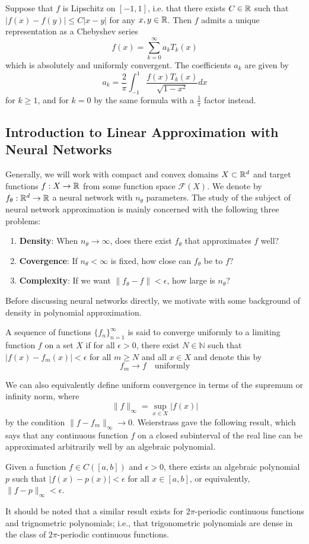 \begin{theorem} Suppose that $f$ is Lipschitz on $[-1,1]$, i.e. that there exists $C \in \mathbb{R}$ such that $|f(x) - f(y)| \leq C|x - y|$ for any $x, y \in \mathbb{R}$. Then $f$ admits a unique representation as a Chebyshev series
	\[ f(x) = \sum_{k=0}^\infty a_k T_k(x) \]
	which is absolutely and uniformly convergent. The coefficients $a_k$ are given by
	\[ a_k = \frac{2}{\pi} \int_{-1}^1 \frac{f(x)T_k(x)}{\sqrt{1-x^2}} dx \]
	for $k \geq 1$, and for $k=0$ by the same formula with a $\frac{1}{\pi}$ factor instead.
\end{theorem}

\subsection{Introduction to Linear Approximation with Neural Networks}
Generally, we will work with compact and convex domains $X \subset \mathbb{R}^d$ and target functions $f: X \rightarrow \mathbb{R}$ from some function space $\mathcal{F}(X)$. We denote by $f_\theta: \mathbb{R}^d \rightarrow \mathbb{R}$ a neural network with $n_\theta$ parameters. The study of the subject of neural network approximation is mainly concerned with the following three problems:
\begin{enumerate}
	\item \textbf{Density}: When $n_\theta \rightarrow \infty$, does there exist $f_\theta$ that approximates $f$ well?
	\item \textbf{Covergence}: If $n_\theta < \infty$ is fixed, how close can $f_\theta$ be to $f$?
	\item \textbf{Complexity}: If we want $\| f_\theta - f \| < \epsilon$, how large is $n_\theta$?
\end{enumerate}
Before discussing neural networks directly, we motivate with some background of density in polynomial approximation.
\begin{dfn}
	A sequence of functions $\{f_n\}_{n=1}^\infty$ is said to converge uniformly to a limiting function $f$ on a set $X$ if for all $\epsilon > 0$, there exist $N \in \mathbb{N}$ such that $|f(x) - f_m(x)| <\epsilon$ for all $m \geq N$ and all $x \in X$ and denote this by \[f_m \rightarrow f \quad \text{uniformly} \]
\end{dfn}
We can also equivalently define uniform convergence in terms of the supremum or infinity norm, where
\[ \| f\|_\infty = \sup_{x \in X}|f(x)| \]
by the condition $\| f - f_m \|_\infty \rightarrow 0$.
Weierstrass gave the following result, which says that any continuous function $f$ on a closed subinterval of the real line can be approximated arbitrarily well by an algebraic polynomial.
\begin{theorem}[Weierstrass]
  Given a function $f \in C([a, b])$ and $\epsilon > 0$, there exists an algebraic polynomial $p$ such that $|f(x) - p(x)| <\epsilon$ for all $x \in [a, b]$, or equivalently, $\| f - p \|_\infty < \epsilon$. 
\end{theorem}
It should be noted that a similar result exists for $2\pi$-periodic continuous functions and trignometric polynomials; i.e., that trigonometric polynomials are dense in the class of $2\pi$-periodic continuous functions.
